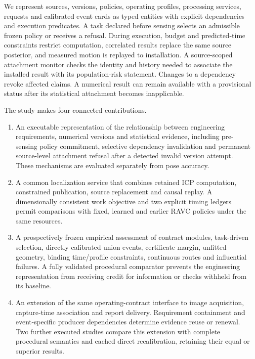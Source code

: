 We represent sources, versions, policies, operating profiles, processing services, requests and calibrated event cards as typed entities with explicit dependencies and execution predicates. A task declared before sensing selects an admissible frozen policy or receives a refusal. During execution, budget and predicted-time constraints restrict computation, correlated results replace the same source posterior, and measured motion is replayed to installation. A source-scoped attachment monitor checks the identity and history needed to associate the installed result with its population-risk statement. Changes to a dependency revoke affected claims. A numerical result can remain available with a provisional status after its statistical attachment becomes inapplicable.

The study makes four connected contributions.
\begin{enumerate}
\item An executable representation of the relationship between engineering requirements, numerical versions and statistical evidence, including pre-sensing policy commitment, selective dependency invalidation and permanent source-level attachment refusal after a detected invalid version attempt. These mechanisms are evaluated separately from pose accuracy.
\item A common localization service that combines retained ICP computation, constrained publication, source replacement and causal replay. A dimensionally consistent work objective and two explicit timing ledgers permit comparisons with fixed, learned and earlier RAVC policies under the same resources.
\item A prospectively frozen empirical assessment of contract modules, task-driven selection, directly calibrated union events, certificate margin, unfitted geometry, binding time/profile constraints, continuous routes and influential failures. A fully validated procedural comparator prevents the engineering representation from receiving credit for information or checks withheld from its baseline.
\item An extension of the same operating-contract interface to image acquisition, capture-time association and report delivery. Requirement containment and event-specific producer dependencies determine evidence reuse or renewal. Two further executed studies compare this extension with complete procedural semantics and cached direct recalibration, retaining their equal or superior results.
\end{enumerate}

